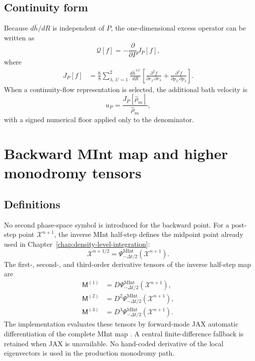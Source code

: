 \documentclass[
  11pt,
  letterpaper,
  onehalfspacing,
  normalmargins,
  equalmargins,
  oneside
]{ut-thesis}
\begin{document}
\subsection{Continuity form}
\label{appsubsec:excess-flux}

Because \(d\bar h/dR\) is independent of \(P\), the one-dimensional excess
operator can be written as
\begin{equation}
\mathcal Q[f]
=
-\frac{\partial}{\partial P}
J_P[f],
\label{appeq:q-flux-form}
\end{equation}
where
\begin{align}
J_P[f]
&=
\frac{\hbar}{8}
\sum_{\lambda,\lambda'=1}^{2}
\frac{d\bar h^{\lambda\lambda'}}{dR}
\left[
\frac{\partial^2f}
{\partial r_{\lambda'}\partial r_\lambda}
+
\frac{\partial^2f}
{\partial p_{\lambda'}\partial p_\lambda}
\right].
\label{appeq:excess-flux}
\end{align}
When a continuity-flow representation is selected, the additional bath
velocity is
\begin{equation}
u_P
=
\frac{
J_P[\widehat{\rho}_m]
}{
\widehat{\rho}_m
},
\label{appeq:continuity-velocity}
\end{equation}
with a signed numerical floor applied only to the denominator.

\section{Backward MInt map and higher monodromy tensors}
\label{appsec:monodromy}

\subsection{Definitions}
\label{appsubsec:monodromy-definitions}

No second phase-space symbol is introduced for the backward point. For a
post-step point \(\boldsymbol{\mathcal X}^{n+1}\), the inverse MInt
half-step defines the midpoint point already used in
Chapter~\ref{chap:density-level-integration}:
\begin{equation}
\boldsymbol{\mathcal X}^{n+1/2}
=
\Psi_{-\Delta t/2}^{\mathrm{MInt}}
\left(\boldsymbol{\mathcal X}^{n+1}\right).
\label{appeq:backward-half-step-map}
\end{equation}
The first-, second-, and third-order derivative tensors of the inverse
half-step map are
\begin{align}
\mathsf M^{(1)}
&=
D\Psi_{-\Delta t/2}^{\mathrm{MInt}}
\left(\boldsymbol{\mathcal X}^{n+1}\right),
\\
\mathsf M^{(2)}
&=
D^2\Psi_{-\Delta t/2}^{\mathrm{MInt}}
\left(\boldsymbol{\mathcal X}^{n+1}\right),
\\
\mathsf M^{(3)}
&=
D^3\Psi_{-\Delta t/2}^{\mathrm{MInt}}
\left(\boldsymbol{\mathcal X}^{n+1}\right).
\label{appeq:monodromy-tensors}
\end{align}
The implementation evaluates these tensors by forward-mode JAX automatic
differentiation of the complete MInt map \cite{Bradbury2018JAX}. A central finite-difference fallback
is retained when JAX is unavailable. No hand-coded derivative of the local
eigenvectors is used in the production monodromy path.
\end{document}
